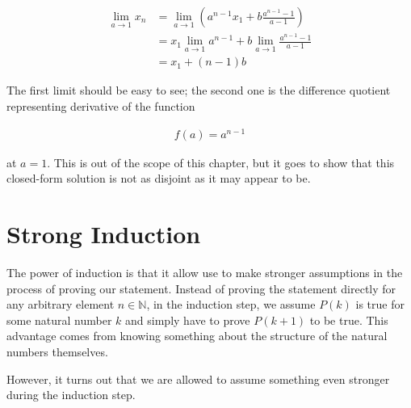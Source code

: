 \begin{align*}
	\lim_{a \rightarrow 1} x_n &= \lim_{a \rightarrow 1} \left( a^{n - 1} x_1 + b \frac{a^{n - 1} - 1}{a - 1} \right) \\
	&= x_1 \lim_{a \rightarrow 1} a^{n - 1} + b \lim_{a \rightarrow 1} \frac{a^{n - 1} - 1}{a - 1} \\
	&= x_1 + (n -1) b
\end{align*}

The first limit should be easy to see; the second one is the difference quotient representing derivative of the function

\begin{align*}
	f(a) = a^{n - 1}
\end{align*}

at $a = 1$. This is out of the scope of this chapter, but it goes to show that this closed-form solution is not as disjoint as it may appear to be.


\section{Strong Induction}


The power of induction is that it allow use to make stronger assumptions in the process of proving our statement. Instead of proving the statement directly for any arbitrary element $n \in \mathbb{N}$, in the induction step, we assume $P(k)$ is true for some natural number $k$ and simply have to prove $P(k + 1)$ to be true. This advantage comes from knowing something about the structure of the natural numbers themselves.

However, it turns out that we are allowed to assume something even stronger during the induction step.


